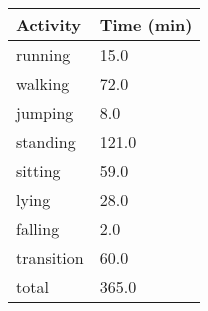 \begin{tabular}{ll}
\toprule
   Activity & Time (min) \\
\midrule
    running &       15.0 \\
    walking &       72.0 \\
    jumping &        8.0 \\
   standing &      121.0 \\
    sitting &       59.0 \\
      lying &       28.0 \\
    falling &        2.0 \\
 transition &       60.0 \\
      total &      365.0 \\
\bottomrule
\end{tabular}
